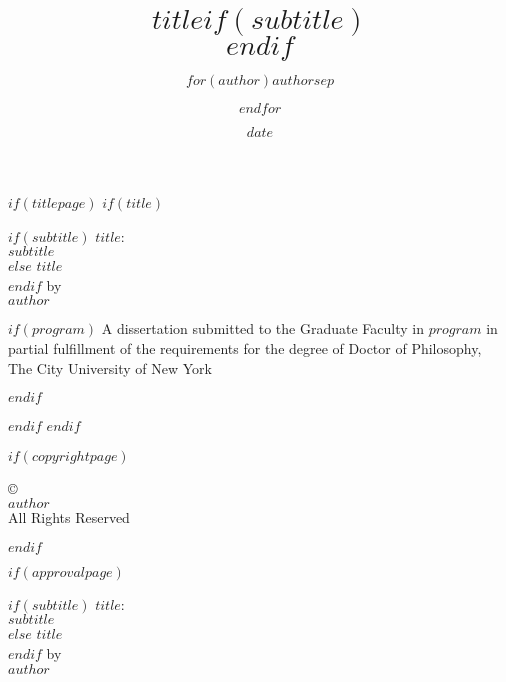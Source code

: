 \documentclass[$if(draft)$$draft$,$endif$$if(fontsize)$$fontsize$,$endif$$if(lang)$$babel-lang$,$endif$$if(papersize)$$papersize$,$endif$$if(sides)$$sides$,$endif$$for(classoption)$$classoption$$sep$,$endfor$]{$documentclass$}
\title{$title$$if(subtitle)$\\\vspace{0.5em}{\large $subtitle$}$endif$}
\author{$for(author)$$author$$sep$ \and $endfor$}
\date{$date$}
\begin{document}
\frontmatter

$if(titlepage)$
$if(title)$
\begin{titlepage}
\begin{center}
\phantom{}\vspace{2in}
$if(subtitle)$
\uppercase{$title$}:\\
\uppercase{$subtitle$}\\[0.5in]
$else$
\uppercase{$title$}\\[0.5in]
$endif$
by \\[0.5in]
\uppercase{$author$}\par
\vspace{\fill}
$if(program)$
A dissertation submitted to the Graduate Faculty in $program$ in partial fulfillment of the requirements for the degree of Doctor of Philosophy,\\The City University of New York
\\[0.25in]
\par
$endif$

\number\year

\end{center}
\end{titlepage}
\setcounter{page}{2}
$endif$
$endif$

$if(copyrightpage)$
\clearpage{}
{}
\phantom{}\vspace{\fill}
\begin{center}
\copyright\enspace\number\year\\
\uppercase{$author$}\\
All Rights Reserved\\
\end{center}
$endif$

$if(approvalpage)$
\clearpage{}
{}
\begin{center}
\singlespacing
$if(subtitle)$
$title$:\\
$subtitle$\\[1em]
$else$
$title$\\[1em]
$endif$
by \\[1em]
$author$\par
\end{center}
\end{document}
